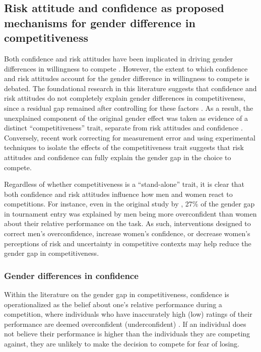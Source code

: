 \documentclass[letterpaper, nobind]{templates/ociamthesis}
\begin{document}
\hypertarget{risk-attitude-and-confidence-as-proposed-mechanisms-for-gender-difference-in-competitiveness}{%
\subsection{Risk attitude and confidence as proposed mechanisms for gender difference in competitiveness}\label{risk-attitude-and-confidence-as-proposed-mechanisms-for-gender-difference-in-competitiveness}}

Both confidence and risk attitudes have been implicated in driving gender differences in willingness to compete \autocite{Niederle2011,Veldhuizen2017}. However, the extent to which confidence and risk attitudes account for the gender difference in willingness to compete is debated. The foundational research in this literature suggests that confidence and risk attitudes do not completely explain gender differences in competitiveness, since a residual gap remained after controlling for these factors \autocite{Niederle2007}. As a result, the unexplained component of the original gender effect was taken as evidence of a distinct ``competitiveness'' trait, separate from risk attitudes and confidence \autocite{Niederle2007,Niederle2011}. Conversely, recent work correcting for measurement error \autocite{Gillen2019} and using experimental techniques to isolate the effects of the competitiveness trait \autocite{Veldhuizen2017} suggests that risk attitudes and confidence can fully explain the gender gap in the choice to compete.

Regardless of whether competitiveness is a ``stand-alone'' trait, it is clear that both confidence and risk attitudes influence how men and women react to competitions. For instance, even in the original study by \textcite{Niederle2007}, 27\% of the gender gap in tournament entry was explained by men being more overconfident than women about their relative performance on the task. As such, interventions designed to correct men's overconfidence, increase women's confidence, or decrease women's perceptions of risk and uncertainty in competitive contexts may help reduce the gender gap in competitiveness.

\hypertarget{gender-differences-in-confidence}{%
\subsubsection{Gender differences in confidence}\label{gender-differences-in-confidence}}

Within the literature on the gender gap in competitiveness, confidence is operationalized as the belief about one's relative performance during a competition, where individuals who have inaccurately high (low) ratings of their performance are deemed overconfident (underconfident) \autocites{Niederle2011}[also see overplacement in][]{Moore2008,Moore2017}. If an individual does not believe their performance is higher than the individuals they are competing against, they are unlikely to make the decision to compete for fear of losing.
\end{document}
